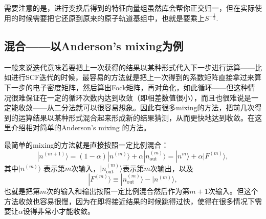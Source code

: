 \documentclass[12pt,a4paper,openany,twoside]{book}
\numberwithin{equation}{section}
\begin{document}
            需要注意的是，进行变换后得到的特征向量组虽然库会帮你正交归一，但在实际使用的时候需要把它还原到原来的原子轨道基组中，也就是要乘上$S^{-\frac{1}{2}}$.

          \subsection{混合——以Anderson's mixing为例}
            一般来说迭代意味着要把上一次获得的结果以某种形式代入下一步进行运算——比如进行SCF迭代的时候，最容易的方法就是把上一次得到的系数矩阵直接拿过来算下一步的电子密度矩阵，然后算出Fock矩阵，再对角化，如此循环——但这种情况很难保证在一定的循环次数内达到收敛（即相差数值很小），而且也很难说是一定能收敛——从二分法就可以很容易想象。因此有很多mixing的方法，把前几次得到的运算结果以某种形式混合起来形成新的结果猜测，从而更快地达到收敛。在这里介绍相对简单的Anderson's mixing 的方法\cite{johnson1988modified}。

            最简单的mixing的方法就是直接按照一定比例混合：
            \begin{equation}
                |n^{(m+1)}\rangle = (1-\alpha) |n^{(m)}\rangle + \alpha | n_{\text{out}}^{(m)} \rangle = |n^{m} \rangle + \alpha | F^{(m)} \rangle,
            \end{equation}
            其中$|n^{(m)}\rangle$ 表示第$m$次输入，$|n^{(m)}_\text{out}\rangle$表示第$m$次输出，以及
            \begin{equation}
                |F^{(m)}\rangle \equiv |n_\text{out}^{(m)} \rangle - |n^{(m)}\rangle,
            \end{equation}
            也就是把第$m$次的输入和输出按照一定比例混合然后作为第$m+1$次输入。但这个方法收敛也容易很慢，因为在即将接近结果的时候跳得过快，使得在很多情况下需要让$\alpha$设得非常小才能收敛。
\end{document}
